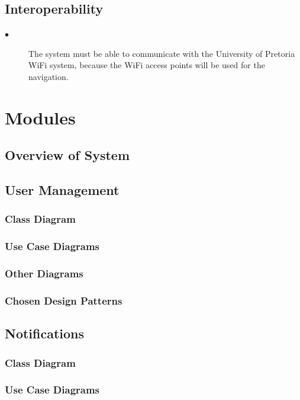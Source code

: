 \documentclass{article}
\begin{document}
    \subsection{Interoperability}
    
        \begin{description}
        
        \item[$\bullet$]The system must be able to communicate with the University of Pretoria WiFi system, because the WiFi  access points will be used for the navigation.
        
        \end{description}

\section{Modules}
	
	\subsection{Overview of System}
	
    \subsection{User Management}
        \subsubsection{Class Diagram}
        \subsubsection{Use Case Diagrams}
        \subsubsection{Other Diagrams}
        \subsubsection{Chosen Design Patterns}
    \subsection{Notifications}
        \subsubsection{Class Diagram}
        \subsubsection{Use Case Diagrams}
\end{document}
